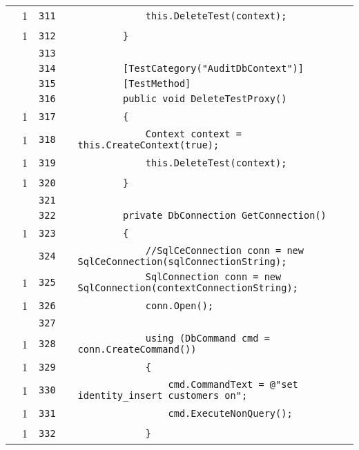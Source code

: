 \documentclass[a4paper,10pt]{article}
\begin{document}
\begin{longtable}[l]{lrrll}
\cellcolor{green} & 1 & \verb~311~ & & \verb~            this.DeleteTest(context);~\\
\cellcolor{green} & 1 & \verb~312~ & & \verb~        }~\\
\cellcolor{gray} &  & \verb~313~ & & \verb~~\\
\cellcolor{gray} &  & \verb~314~ & & \verb~        [TestCategory("AuditDbContext")]~\\
\cellcolor{gray} &  & \verb~315~ & & \verb~        [TestMethod]~\\
\cellcolor{gray} &  & \verb~316~ & & \verb~        public void DeleteTestProxy()~\\
\cellcolor{green} & 1 & \verb~317~ & & \verb~        {~\\
\cellcolor{green} & 1 & \verb~318~ & & \verb~            Context context = this.CreateContext(true);~\\
\cellcolor{green} & 1 & \verb~319~ & & \verb~            this.DeleteTest(context);~\\
\cellcolor{green} & 1 & \verb~320~ & & \verb~        }~\\
\cellcolor{gray} &  & \verb~321~ & & \verb~~\\
\cellcolor{gray} &  & \verb~322~ & & \verb~        private DbConnection GetConnection()~\\
\cellcolor{green} & 1 & \verb~323~ & & \verb~        {~\\
\cellcolor{gray} &  & \verb~324~ & & \verb~            //SqlCeConnection conn = new SqlCeConnection(sqlConnectionString);~\\
\cellcolor{green} & 1 & \verb~325~ & & \verb~            SqlConnection conn = new SqlConnection(contextConnectionString);~\\
\cellcolor{green} & 1 & \verb~326~ & & \verb~            conn.Open();~\\
\cellcolor{gray} &  & \verb~327~ & & \verb~~\\
\cellcolor{green} & 1 & \verb~328~ & & \verb~            using (DbCommand cmd = conn.CreateCommand())~\\
\cellcolor{green} & 1 & \verb~329~ & & \verb~            {~\\
\cellcolor{green} & 1 & \verb~330~ & & \verb~                cmd.CommandText = @"set identity_insert customers on";~\\
\cellcolor{green} & 1 & \verb~331~ & & \verb~                cmd.ExecuteNonQuery();~\\
\cellcolor{green} & 1 & \verb~332~ & & \verb~            }~\\

\end{longtable}
\end{document}
